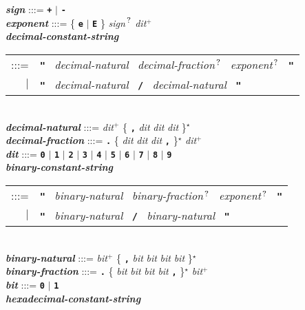 \documentclass[12pt]{article}
\newcommand{\TT}[1]{{\tt \bfseries #1}}
\newcommand{\STAR}{{\Large $^\star$}}
\newcommand{\PLUS}[1][]{{$^{+#1}$}}
\newcommand{\QMARK}{{$^{\,\mbox{\footnotesize ?}}$}}
\newcommand{\emkey}[1]{{\em \bfseries #1}}
\newenvironment{indpar}[1][0.3in]%
	{\begin{list}{}%
		     {\setlength{\itemsep}{0in}%
		      \setlength{\topsep}{0in}%
		      \setlength{\parsep}{1ex}%
		      \setlength{\labelwidth}{#1}%
		      \setlength{\leftmargin}{#1}%
		      \addtolength{\leftmargin}{\labelsep}}%
	 \item}%
	{\end{list}}
\begin{document}
\begin{indpar}
\emkey{sign} :::= \TT{+} $|$ \TT{-} \\
\emkey{exponent} :::=
	\{ \TT{e} $|$ \TT{E} \} {\em sign}\QMARK{} {\em dit}\PLUS{}
\\[0.5ex]
\emkey{decimal-constant-string} \\
\hspace*{0.5in}
    \begin{tabular}[t]{@{}rl}
    :::= & \TT{"}~ {\em decimal-natural}~ {\em decimal-fraction}\QMARK{}~
    				          {\em exponent}\QMARK{}~ \TT{"} \\
     $|$ & \TT{"}~ {\em decimal-natural}~ \TT{/}~
                   {\em decimal-natural}~ \TT{"} \\
    \end{tabular}
\\[0.5ex]
\emkey{decimal-natural}
    :::= {\em dit}\PLUS{} 
         \{ \TT{,} {\em dit} {\em dit} {\em dit} \}\STAR{} \\
\emkey{decimal-fraction} :::=
    \TT{.} \{ {\em dit} {\em dit} {\em dit} \TT{,} \}\STAR{}
           {\em dit}\PLUS{} \\
\emkey{dit}\label{DIT}
	:::= \TT{0} $|$ \TT{1} $|$ \TT{2} $|$ \TT{3} $|$ \TT{4}
                    $|$ \TT{5} $|$ \TT{6} $|$ \TT{7} $|$ \TT{8} $|$ \TT{9}
\\[0.5ex]
\emkey{binary-constant-string} \\
\hspace*{0.5in}
    \begin{tabular}[t]{@{}rl}
    :::= & \TT{"}~ {\em binary-natural}~ {\em binary-fraction}\QMARK{}~
    				          {\em exponent}\QMARK{}~ \TT{"} \\
     $|$ & \TT{"}~ {\em binary-natural}~ \TT{/}~
                   {\em binary-natural}~ \TT{"} \\
    \end{tabular}
\\[0.5ex]
\emkey{binary-natural}
    :::= {\em bit}\PLUS{}
           \{ \TT{,} {\em bit} {\em bit} {\em bit} {\em bit} \}\STAR{} \\
\emkey{binary-fraction} :::=
    \TT{.} \{ {\em bit} {\em bit} {\em bit} {\em bit} \TT{,} \}\STAR{}
    {\em bit}\PLUS{} \\
\emkey{bit} :::= \TT{0} $|$ \TT{1}
\\[0.5ex]
\emkey{hexadecimal-constant-string} \\
\hspace*{0.5in}
    \begin{tabular}[t]{@{}rl}

\end{tabular}
\end{indpar}
\end{document}
